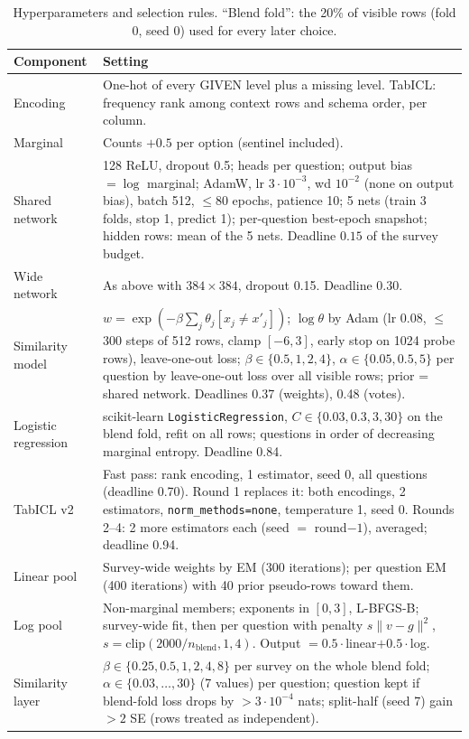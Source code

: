 \documentclass{article}
\begin{document}
\begin{table}[h]
\centering
\small
\caption{Hyperparameters and selection rules. ``Blend fold'': the 20\% of visible rows (fold 0, seed 0) used for every later choice.}
\label{tab:hyper}
\begin{tabular}{p{2.6cm}p{10.4cm}}
\toprule
Component & Setting \\
\midrule
Encoding & One-hot of every GIVEN level plus a missing level. TabICL: frequency rank among context rows and schema order, per column. \\
Marginal & Counts $+0.5$ per option (sentinel included). \\
Shared network & 128 ReLU, dropout 0.5; heads per question; output bias $=\log$ marginal; AdamW, lr $3\cdot10^{-3}$, wd $10^{-2}$ (none on output bias), batch 512, $\le$80 epochs, patience 10; 5 nets (train 3 folds, stop 1, predict 1); per-question best-epoch snapshot; hidden rows: mean of the 5 nets. Deadline $0.15$ of the survey budget. \\
Wide network & As above with $384\times384$, dropout 0.15. Deadline $0.30$. \\
Similarity model & $w=\exp(-\beta\sum_j\theta_j[x_j\ne x'_j])$; $\log\theta$ by Adam (lr 0.08, $\le$300 steps of 512 rows, clamp $[-6,3]$, early stop on 1024 probe rows), leave-one-out loss; $\beta\in\{0.5,1,2,4\}$, $\alpha\in\{0.05,0.5,5\}$ per question by leave-one-out loss over all visible rows; prior = shared network. Deadlines 0.37 (weights), 0.48 (votes). \\
Logistic regression & scikit-learn \texttt{LogisticRegression}, $C\in\{0.03,0.3,3,30\}$ on the blend fold, refit on all rows; questions in order of decreasing marginal entropy. Deadline 0.84. \\
TabICL v2 & Fast pass: rank encoding, 1 estimator, seed 0, all questions (deadline 0.70). Round 1 replaces it: both encodings, 2 estimators, \texttt{norm\_methods=none}, temperature 1, seed 0. Rounds 2--4: 2 more estimators each (seed $=$ round$-1$), averaged; deadline 0.94. \\
Linear pool & Survey-wide weights by EM (300 iterations); per question EM (400 iterations) with 40 prior pseudo-rows toward them. \\
Log pool & Non-marginal members; exponents in $[0,3]$, L-BFGS-B; survey-wide fit, then per question with penalty $s\lVert v-g\rVert^2$, $s=\mathrm{clip}(2000/n_\text{blend},1,4)$. Output $=0.5\cdot$linear$+0.5\cdot$log. \\
Similarity layer & $\beta\in\{0.25,0.5,1,2,4,8\}$ per survey on the whole blend fold; $\alpha\in\{0.03,\dots,30\}$ (7 values) per question; question kept if blend-fold loss drops by $>3\cdot10^{-4}$ nats; split-half (seed 7) gain $>2$ SE (rows treated as independent). \\

\end{tabular}
\end{table}
\end{document}
